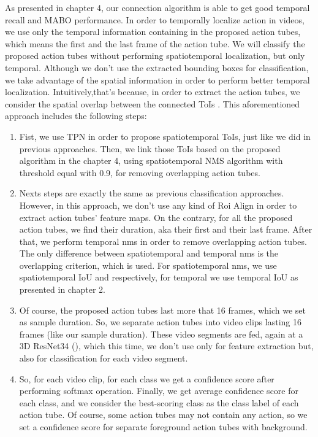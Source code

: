 As presented in chapter 4, our connection algorithm is able to get good temporal recall and MABO performance. 
In order to temporally localize action in videos, we use only the temporal information containing in the proposed action tubes, which means the first and the last frame of the action tube. We will classify the proposed action tubes without performing spatiotemporal localization, but only temporal. Although we don't use the extracted bounding boxes for classification, we take advantage of the spatial information in order to perform better temporal localization. Intuitively,that's because, in order to extract the action tubes, we consider the spatial overlap between the connected ToIs . This aforementioned approach includes the following steps:
\begin{enumerate}
\item Fist, we use TPN in order to propose  spatiotemporal ToIs, just like we did in previous approaches. Then, we link those ToIs based
  on the proposed algorithm in the chapter 4, using spatiotemporal NMS algorithm with threshold equal with 0.9, for removing overlapping action tubes.
\item Nexts steps are exactly the same as previous classification approaches. However, in this approach, we don't use any kind of Roi Align
  in order to extract action tubes' feature maps. On the contrary, for all the proposed action tubes, we find their duration, aka their first
  and their last frame. After that, we perform temporal nms in order to remove overlapping action tubes. The only difference between
  spatiotemporal and temporal nms is the overlapping criterion, which is used. For spatiotemporal nms, we use spatiotemporal IoU and
  respectively, for temporal we use temporal IoU as presented in chapter 2.
\item Of course, the proposed action tubes last more that 16 frames, which we set as sample duration. So, we separate action tubes into
  video clips lasting 16 frames (like our sample duration). These video segments are fed, again at a 3D ResNet34 (\cite{hara3dcnns}), which
   this time, we don't use  only for feature extraction but, also for classification for each video segment.
\item So, for each video clip, for each class we get a confidence score after performing softmax operation. Finally, we get
  average confidence score for each class, and we consider the best-scoring class as the class label of each action tube.
  Of course, some action tubes may not contain any action, so we set a confidence score for separate foreground action tubes with
  background.
\end{enumerate}

